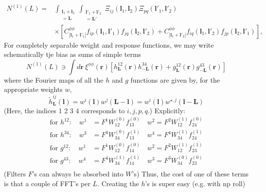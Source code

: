 \documentclass[11pt]{article}
\begin{document}
\newcommand{\bl}{\boldsymbol{l}}
\newcommand{\br}{\boldsymbol{r}}

\newcommand{\bll}{\boldsymbol{L}}
\newcommand{\intL}{\int_{\substack{\bl_1 + \bl_2 \\ =\bll }}}
\newcommand{\intLp}{\int_{\substack{\bl'_1 + \bl'_2 \\ =\bll' }}}

\begin{equation}
\begin{split}
N^{(1)}(L) = &\intL \intLp \Xi_{ij}(\bl_1, \bl_2) \Xi_{pq}(\bl'_1, \bl'_2) \\ &\times\left[ C^{\phi \phi}_{|\bl_1+\bl'_1|}f_{ip}(\bl_1, \bl'_1) f_{jq}(\bl_2, \bl'_2) + C^{\phi \phi}_{|\bl_1+\bl'_2|}f_{iq}(\bl_1, \bl'_2) f_{jp}(\bl_2, \bl'_1) \right] ,
\end{split}
\end{equation}
For completely separable weight and response functions, we may write schematically tje bias as sums of simple terms
\begin{equation}
	N^{(1)}(L) \ni  \int d\br\: \xi^{\phi \phi}(\br)\left[ h^{12}_{\bll}(\br) h^{34}_{-\bll}(\br) + g^{12}_{\bll}(\br) g^{43}_{-\bll}(\br)\right ]
\end{equation}
where the Fourier maps of all the $h$ and $g$ functions are given by, for the appropriate weights $w$,
\begin{equation}
	\tilde h^{ij}_{\bll}(\bl) =  w^i(\bl) w^j(\bll - \bl) = w^i(\bl) w^{\star, j}(\bl - \bll)
\end{equation}
(Here, the indices 1 2 3 4 corresponds to $i,j,p,q$.)
Explicitly:
\begin{equation}
\begin{split}
\textrm{for }h^{12}:\quad w^1 &= F^1 W_{12}^{(0)} f^{(0)}_{13}	\quad w^2 = F^2W_{12}^{(1)}f^{(0)}_{24} \\
\textrm{for }h^{34}:\quad w^3 &= F^3 W_{34}^{(0)} f^{(1)}_{13}	\quad w^4 = F^4W_{34}^{(1)}f^{(1)}_{24} \\
\textrm{for }g^{12}:\quad w^1 &= F^1 W_{12}^{(0)} f^{(0)}_{14}	\quad w^2 = F^2W_{12}^{(1)}f^{(1)}_{23} \\
\textrm{for }g^{43}:\quad w^4 &= F^4 W_{34}^{(1)} f^{(1)}_{14}	\quad w^3 = F^3W_{34}^{(0)}f^{(0)}_{23} \\
\end{split}
\end{equation}
(Filters $F$'s can always be absorbed into $W$'s)
Thus, the cost of one of these terms is that a couple of FFT's per $L$. Creating the $h$'s is super easy (e.g. with np roll)
\end{document}
